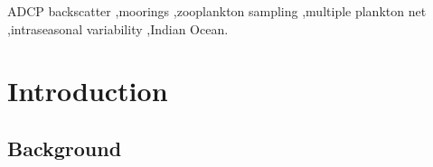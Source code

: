 \documentclass[authoryear,review,11pt]{elsarticle}
\begin{document}
\begin{frontmatter}
\begin{abstract}

\end{abstract}

\begin{keyword}
	ADCP backscatter \sep moorings \sep zooplankton sampling \sep multiple plankton net \sep intraseasonal variability \sep Indian Ocean.
\end{keyword}
\end{frontmatter}


\pagebreak


\linenumbers

\section{Introduction}
\label{sec:intro}

\subsection{Background}
\label{sec:intro.back}
\end{document}
